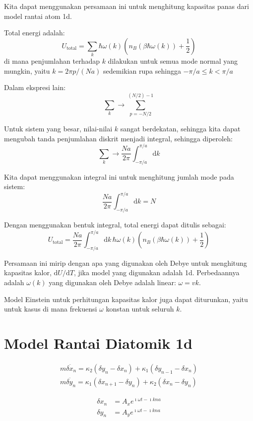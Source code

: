 Kita dapat menggunakan persamaan ini untuk menghitung kapasitas panas
dari model rantai atom 1d.

Total energi adalah: \[
U_{\mathrm{total}} = \sum_{k} \hbar \omega(k) \left(
n_{B}(\beta\hbar\omega(k)) + \frac{1}{2}
\right)
\] di mana penjumlahan terhadap \(k\) dilakukan untuk semua mode normal
yang mungkin, yaitu \(k = 2\pi p /(Na)\) sedemikian rupa sehingga
\(-\pi/a \leq k < \pi/a\)

Dalam ekspresi lain:
\begin{equation*}
\sum_{k} \rightarrow \sum_{p = -N/2}^{(N/2)-1}  
\end{equation*}

Untuk sistem yang besar, nilai-nilai \(k\) sangat berdekatan, sehingga
kita dapat mengubah tanda penjumlahan diskrit menjadi integral, sehingga
diperoleh: \[
\sum_{k} \rightarrow \frac{Na}{2\pi} \int_{-\pi/a}^{\pi/a}\mathrm{d}k
\]

Kita dapat menggunakan integral ini untuk menghitung jumlah mode pada
sistem: \[
\frac{Na}{2\pi} \int_{-\pi/a}^{\pi/a}\mathrm{d}k = N
\]

Dengan menggunakan bentuk integral, total energi dapat ditulis sebagai:
\[
U_{\mathrm{total}} = \frac{Na}{2\pi}
\int_{-\pi/a}^{\pi/a} \mathrm{d}k \, \hbar \omega(k) \left(
n_{B}(\beta\hbar\omega(k)) + \frac{1}{2}
\right)
\]

Persamaan ini mirip dengan apa yang digunakan oleh Debye untuk
menghitung kapasitas kalor, \(\mathrm{d}U/\mathrm{d}T\), jika model yang
digunakan adalah 1d. Perbedaannya adalah \(\omega(k)\) yang digunakan
oleh Debye adalah linear: \(\omega = vk\).

Model Einstein untuk perhitungan kapasitas kalor juga dapat diturunkan,
yaitu untuk kasus di mana frekuensi \(\omega\) konstan untuk seluruh
\(k\).

\section{Model Rantai Diatomik 1d}


\begin{align}
m \ddot{\delta x_{n}} = \kappa_{2} ( \delta y_{n} - \delta x_{n} ) +
\kappa_{1} ( \delta y_{n-1} - \delta x_{n} ) \\
m \ddot{\delta y_{n}} = \kappa_{1} ( \delta x_{n+1} - \delta y_{n} ) +
\kappa_{2} ( \delta x_{n} - \delta y_{n} )
\end{align}


\begin{align}
\delta x_{n} & = A_{x} e^{\imath \omega t - \imath kna} \\
\delta y_{n} & = A_{y} e^{\imath \omega t - \imath kna}
\end{align}


